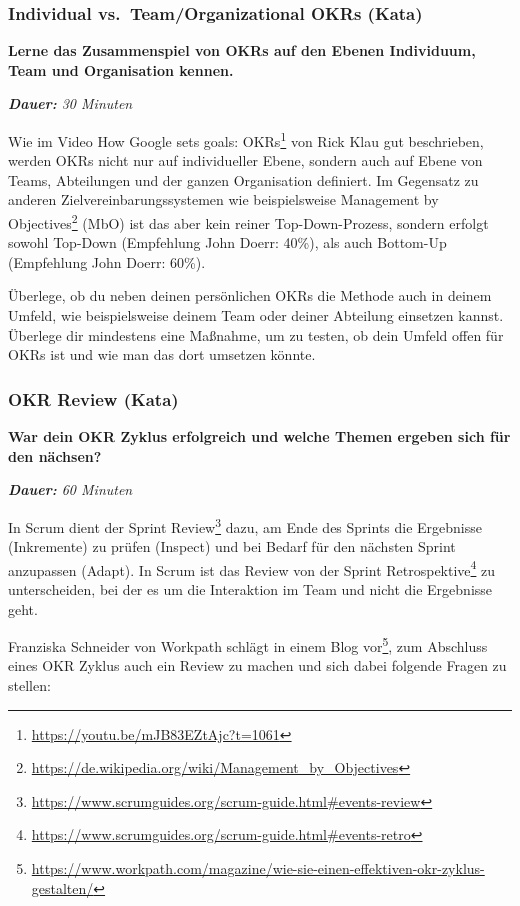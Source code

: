 \documentclass[
  ngerman,
  paper=a4,
,captions=tableheading
]{scrartcl}
\DeclareRobustCommand{\href}[2]{#2\footnote{\url{#1}}}
\begin{document}
\hypertarget{individual-vs.-teamorganizational-okrs-kata}{%
\subsubsection{Individual vs.~Team/Organizational OKRs
(Kata)}\label{individual-vs.-teamorganizational-okrs-kata}}

\textbf{Lerne das Zusammenspiel von OKRs auf den Ebenen Individuum, Team
und Organisation kennen.}

\emph{\textbf{Dauer:} 30 Minuten}

Wie im Video \href{https://youtu.be/mJB83EZtAjc?t=1061}{How Google sets
goals: OKRs} von Rick Klau gut beschrieben, werden OKRs nicht nur auf
individueller Ebene, sondern auch auf Ebene von Teams, Abteilungen und
der ganzen Organisation definiert. Im Gegensatz zu anderen
Zielvereinbarungssystemen wie beispielsweise
\href{https://de.wikipedia.org/wiki/Management_by_Objectives}{Management
by Objectives} (MbO) ist das aber kein reiner Top-Down-Prozess, sondern
erfolgt sowohl Top-Down (Empfehlung John Doerr: 40\%), als auch
Bottom-Up (Empfehlung John Doerr: 60\%).

Überlege, ob du neben deinen persönlichen OKRs die Methode auch in
deinem Umfeld, wie beispielsweise deinem Team oder deiner Abteilung
einsetzen kannst. Überlege dir mindestens eine Maßnahme, um zu testen,
ob dein Umfeld offen für OKRs ist und wie man das dort umsetzen könnte.

\hypertarget{okr-review-kata}{%
\subsubsection{OKR Review (Kata)}\label{okr-review-kata}}

\textbf{War dein OKR Zyklus erfolgreich und welche Themen ergeben sich
für den nächsen?}

\emph{\textbf{Dauer:} 60 Minuten}

In Scrum dient der
\href{https://www.scrumguides.org/scrum-guide.html\#events-review}{Sprint
Review} dazu, am Ende des Sprints die Ergebnisse (Inkremente) zu prüfen
(Inspect) und bei Bedarf für den nächsten Sprint anzupassen (Adapt). In
Scrum ist das Review von der
\href{https://www.scrumguides.org/scrum-guide.html\#events-retro}{Sprint
Retrospektive} zu unterscheiden, bei der es um die Interaktion im Team
und nicht die Ergebnisse geht.

Franziska Schneider von Workpath
\href{https://www.workpath.com/magazine/wie-sie-einen-effektiven-okr-zyklus-gestalten/}{schlägt
in einem Blog vor}, zum Abschluss eines OKR Zyklus auch ein Review zu
machen und sich dabei folgende Fragen zu stellen:
\end{document}
